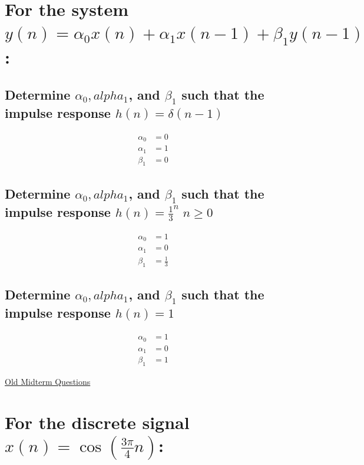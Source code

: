 \documentclass{article}
\renewcommand{\thesubsection}{\thesection.\alph{subsection}}
\begin{document}
\section[Question ~\thesection]{For the system $y(n) = \alpha_0x(n) + \alpha_1x(n - 1) + \beta_1y(n - 1)$:}

\subsection[~\thesubsection]{Determine $\alpha_0, alpha_1$, and $\beta_1$ such that the impulse response $h(n) = \delta(n - 1)$}

\begin{align*}
	\alpha_0 &= 0 \\
	\alpha_1 &= 1 \\
	\beta_1 &= 0
\end{align*}

\subsection[~\thesubsection]{Determine $\alpha_0, alpha_1$, and $\beta_1$ such that the impulse response $h(n) = \frac{1}{3}^n \; n \ge 0$}

\begin{align*}
	\alpha_0 &= 1 \\
	\alpha_1 &= 0 \\
	\beta_1 &= \frac{1}{3}
\end{align*}

\subsection[~\thesubsection]{Determine $\alpha_0, alpha_1$, and $\beta_1$ such that the impulse response $h(n) = 1$}

\begin{align*}
	\alpha_0 &= 1 \\
	\alpha_1 &= 0 \\
	\beta_1 &= 1
\end{align*}

\newpage

\begin{center}
	\Large{\underline{Old Midterm Questions}}
\end{center}

\section[Question ~\thesection]{For the discrete signal $x(n) = \cos{(\frac{3\pi}{4}n)}$:}
\end{document}
